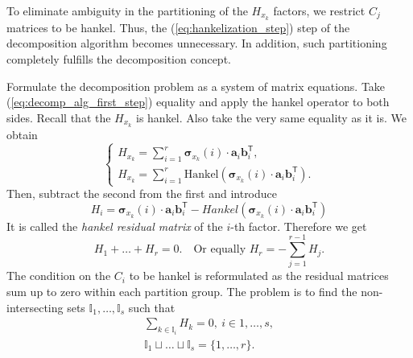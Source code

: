 \documentclass[referee, pdflatex, sn-mathphys-num]{sn-jnl}
\theoremstyle{definition}
\theoremstyle{plain}
\begin{document}
	To eliminate ambiguity in the partitioning of the $ H_{x_k} $ factors, we restrict $ C_j $ matrices to be hankel. Thus, the (\ref{eq:hankelization_step}) step of the decomposition algorithm becomes unnecessary. In addition, such partitioning completely fulfills the decomposition concept. 
	
	Formulate the decomposition problem as a system of matrix equations. Take (\ref{eq:decomp_alg_first_step}) equality and apply the hankel operator to both sides. Recall that the $ H_{x_k} $ is hankel. Also take the very same equality as it is. We obtain \begin{equation*}
		\begin{cases*}
			H_{x_k} = \sum\limits_{i = 1}^{r} \boldsymbol{\sigma}_{x_k}(i) \cdot \mathbf{a}_i  \mathbf{b}_i^{\mathsf{T}}, \\
			H_{x_k} = \sum\limits_{i = 1}^{r} \text{Hankel}(\boldsymbol{\sigma}_{x_k}(i) \cdot \mathbf{a}_i  \mathbf{b}_i^{\mathsf{T}}).
		\end{cases*}
	\end{equation*}	Then, subtract the second from the first and introduce \begin{equation}\label{eq:hankel_resid_matrix}
		H_i = \boldsymbol{\sigma}_{x_k}(i) \cdot \mathbf{a}_i  \mathbf{b}_i^{\mathsf{T}} - Hankel(\boldsymbol{\sigma}_{x_k}(i) \cdot \mathbf{a}_i  \mathbf{b}_i^{\mathsf{T}})
	\end{equation}	It is called the \emph{hankel residual matrix} of the $ i $-th factor. Therefore we get \begin{equation}\label{eq:residuals_equation}
		H_1 + \ldots + H_r = 0. \quad \text{Or equally } H_r = - \sum\limits_{j = 1}^{r - 1} H_j.
	\end{equation} The condition on the $ C_i $ to be hankel is reformulated as the residual matrices sum up to zero within each partition group. The problem is to find the non-intersecting sets $ \mathbb{I}_1, \ldots , \mathbb{I}_s $ such that	\begin{gather}\label{eq:decomp_opt_init}
		\sum_{k \in \mathbb{I}_i} H_k = 0, \ i \in 1, \ldots, s , \\
		\mathbb{I}_1 \sqcup \ldots \sqcup \mathbb{I}_s = \{1, \ldots, r\} . \nonumber
	\end{gather}
	
\end{document}
